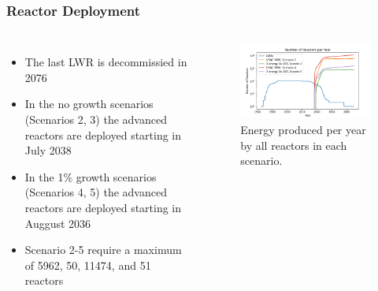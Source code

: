 \begin{frame}
    \frametitle{Reactor Deployment}
    \begin{columns}
        \column[t]{5cm}
        \begin{itemize}
            \item The last \gls{LWR} is decommissied in 2076
            \item In the no growth scenarios (Scenarios 2, 3) the advanced reactors are 
                  deployed starting in July 2038
            \item In the 1\% growth scenarios (Scenarios 4, 5) the advanced reactors are 
                  deployed starting in Auggust 2036
            \item Scenario 2-5 require a maximum of 5962, 50, 11474, and 51 reactors
        \end{itemize}

        \column[t]{5cm}
        \begin{figure}
            \centering 
            \includegraphics[scale=0.3]{figures/rxdeployment_scenarios_all.png}
            \caption{Energy produced per year by all reactors in each scenario.}
            \label{fig:rx_deployment}
        \end{figure}
    \end{columns}
\end{frame}

